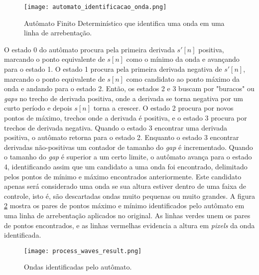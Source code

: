 \begin{figure}[h]
\begin{center}
  \texttt{[image: automato\_identificacao\_onda.png]}
  \caption[\small{Autômato Finito Determinístico que identifica uma onda em uma linha de arrebentação.}]{\label{FigAutomato} \small{Autômato Finito Determinístico que identifica uma onda em uma linha de arrebentação.}}
\end{center}
\end{figure}

\noindent{}O estado 0 do autômato procura pela primeira derivada $s'[n]$ positiva, marcando o ponto equivalente de $s[n]$ como o mínimo da onda e avançando para o estado 1. O estado 1 procura pela primeira derivada negativa de $s'[n]$, marcando o ponto equivalente de $s[n]$ como candidato ao ponto máximo da onda e andando para o estado 2. Então, os estados 2 e 3 buscam por "buracos" ou \textit{gaps} no trecho de derivada positiva, onde a derivada se torna negativa por um curto período e depois $s[n]$ torna a crescer. O estado 2 procura por novos pontos de máximo, trechos onde a derivada é positiva, e o estado 3 procura por trechos de derivada negativa. Quando o estado 3 encontrar uma derivada positiva, o autômato retorna para o estado 2. Enquanto o estado 3 encontrar derivadas não-positivas um contador de tamanho do \textit{gap} é incrementado. Quando o tamanho do \textit{gap} é superior a um certo limite, o autômato avança para o estado 4, identificando assim que um candidato a uma onda foi encontrado, delimitado pelos pontos de mínimo e máximo encontrados anteriormente. Este candidato apenas será considerado uma onda se sua altura estiver dentro de uma faixa de controle, isto é, são descartadas ondas muito pequenas ou muito grandes. A figura \ref{FigWave} mostra os pares de pontos máximo e mínimo identificados pelo autômato em uma linha de arrebentação aplicados no \timestack original. As linhas verdes unem os pares de pontos encontrados, e as linhas vermelhas evidencia a altura em \textit{pixels} da onda identificada. 

\begin{figure}[h]
\begin{center}
  \texttt{[image: process\_waves\_result.png]}
  \caption[\small{Ondas identificadas pelo autômato.}]{\label{FigWave} \small{Ondas identificadas pelo autômato.}}
\end{center}
\end{figure}
